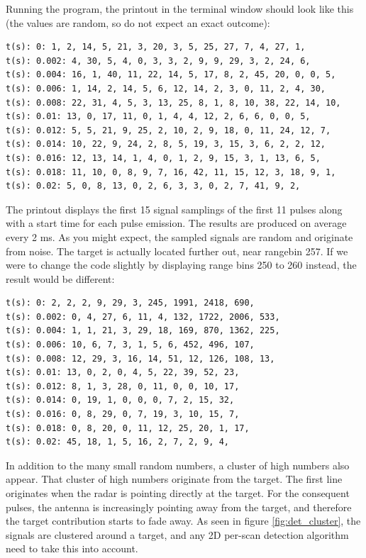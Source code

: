 \documentclass[letterpaper]{book}
\begin{document}
Running the program, the printout in the terminal window should look like this (the values are random, so do not expect an exact outcome):
\begin{lstlisting}
t(s): 0: 1, 2, 14, 5, 21, 3, 20, 3, 5, 25, 27, 7, 4, 27, 1, 
t(s): 0.002: 4, 30, 5, 4, 0, 3, 3, 2, 9, 9, 29, 3, 2, 24, 6, 
t(s): 0.004: 16, 1, 40, 11, 22, 14, 5, 17, 8, 2, 45, 20, 0, 0, 5, 
t(s): 0.006: 1, 14, 2, 14, 5, 6, 12, 14, 2, 3, 0, 11, 2, 4, 30, 
t(s): 0.008: 22, 31, 4, 5, 3, 13, 25, 8, 1, 8, 10, 38, 22, 14, 10, 
t(s): 0.01: 13, 0, 17, 11, 0, 1, 4, 4, 12, 2, 6, 6, 0, 0, 5, 
t(s): 0.012: 5, 5, 21, 9, 25, 2, 10, 2, 9, 18, 0, 11, 24, 12, 7, 
t(s): 0.014: 10, 22, 9, 24, 2, 8, 5, 19, 3, 15, 3, 6, 2, 2, 12, 
t(s): 0.016: 12, 13, 14, 1, 4, 0, 1, 2, 9, 15, 3, 1, 13, 6, 5, 
t(s): 0.018: 11, 10, 0, 8, 9, 7, 16, 42, 11, 15, 12, 3, 18, 9, 1, 
t(s): 0.02: 5, 0, 8, 13, 0, 2, 6, 3, 3, 0, 2, 7, 41, 9, 2, 
\end{lstlisting}
The printout displays the first 15 signal samplings of the first 11 pulses along with a start time for each pulse emission. The results are produced on average every 2 ms. As you might expect, the sampled signals are random and originate from noise. The target is actually located further out, near rangebin 257. If we were to change the code slightly by displaying range bins 250 to 260 instead, the result would be different:
\begin{lstlisting}
t(s): 0: 2, 2, 2, 9, 29, 3, 245, 1991, 2418, 690, 
t(s): 0.002: 0, 4, 27, 6, 11, 4, 132, 1722, 2006, 533, 
t(s): 0.004: 1, 1, 21, 3, 29, 18, 169, 870, 1362, 225, 
t(s): 0.006: 10, 6, 7, 3, 1, 5, 6, 452, 496, 107, 
t(s): 0.008: 12, 29, 3, 16, 14, 51, 12, 126, 108, 13, 
t(s): 0.01: 13, 0, 2, 0, 4, 5, 22, 39, 52, 23, 
t(s): 0.012: 8, 1, 3, 28, 0, 11, 0, 0, 10, 17, 
t(s): 0.014: 0, 19, 1, 0, 0, 0, 7, 2, 15, 32, 
t(s): 0.016: 0, 8, 29, 0, 7, 19, 3, 10, 15, 7, 
t(s): 0.018: 0, 8, 20, 0, 11, 12, 25, 20, 1, 17, 
t(s): 0.02: 45, 18, 1, 5, 16, 2, 7, 2, 9, 4, 
\end{lstlisting}
In addition to the many small random numbers, a cluster of high numbers also appear. That cluster of high numbers originate from the target. The first line originates when the radar is pointing directly at the target. For the consequent pulses, the antenna is increasingly pointing away from the target, and therefore the target contribution starts to fade away. As seen in figure \ref{fig:det_cluster}, the signals are clustered around a target, and any 2D per-scan detection algorithm need to take this into account. 
\end{document}

